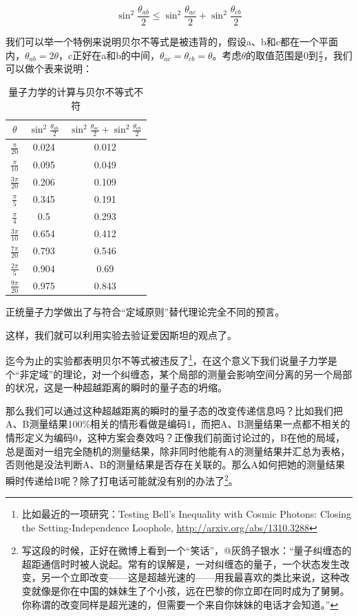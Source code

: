 \begin{equation}
\sin^2 \frac{\theta_{ab}}{2} \le \sin^2 \frac{\theta_{ac}}{2} + \sin^2 \frac{\theta_{cb}}{2}
\end{equation}

我们可以举一个特例来说明贝尔不等式是被违背的，假设a、b和c都在一个平面内，$\theta_{ab} = 2 \theta$，c正好在a和b的中间，$\theta_{ac} = \theta_{cb} = \theta$。考虑$\theta$的取值范围是0到$\frac{\pi}{2}$，我们可以做个表来说明：


\begin{table}[htdp]
\caption{量子力学的计算与贝尔不等式不符}
\begin{center}
\begin{tabular}{|c|c|c|}
\hline
$\theta$ &  $\sin^2 \frac{\theta_{ab}}{2}$  & $\sin^2 \frac{\theta_{ac}}{2} + \sin^2 \frac{\theta_{cb}}{2} $ \\
\hline
$\frac{\pi}{20}$ & 0.024  & 0.012  \\
$\frac{\pi}{10}$ & 0.095  & 0.049  \\
$\frac{3\pi}{20}$ & 0.206  & 0.109  \\
$\frac{\pi}{5}$ & 0.345  & 0.191  \\
$\frac{\pi}{4}$ & 0.5  & 0.293  \\
$\frac{3\pi}{10}$ & 0.654  & 0.412  \\
$\frac{7\pi}{20}$ & 0.793  & 0.546  \\
$\frac{2\pi}{5}$ & 0.904  & 0.69  \\
$\frac{9\pi}{20}$ & 0.975  & 0.843  \\
\hline
\end{tabular}
\end{center}
\label{default}
\end{table}%




正统量子力学做出了与符合“定域原则”替代理论完全不同的预言。

这样，我们就可以利用实验去验证爱因斯坦的观点了。

迄今为止的实验都表明贝尔不等式被违反了\footnote{比如最近的一项研究：Testing Bell's Inequality with Cosmic Photons: Closing the Setting-Independence Loophole, \url{http://arxiv.org/abs/1310.3288}}，在这个意义下我们说量子力学是个“非定域”的理论，对一个纠缠态，某个局部的测量会影响空间分离的另一个局部的状况，这是一种超越距离的瞬时的量子态的坍缩。

那么我们可以通过这种超越距离的瞬时的量子态的改变传递信息吗？比如我们把A、B测量结果100\%相关的情形看做是编码1，而把A、B测量结果一点都不相关的情形定义为编码0，这种方案会奏效吗？正像我们前面讨论过的，B在他的局域，总是面对一组完全随机的测量结果，除非同时他能有A的测量结果并汇总为表格，否则他是没法判断A、B的测量结果是否存在关联的。那么A如何把她的测量结果瞬时传递给B呢？除了打电话可能就没有别的办法了\footnote{写这段的时候，正好在微博上看到一个“笑话”，@灰鸽子银水：“量子纠缠态的超距通信时时被人说起。常有的误解是，一对纠缠态的量子，一个状态发生改变，另一个立即改变——这是超越光速的——用我最喜欢的类比来说，这种改变就像是你在中国的妹妹生了个小孩，远在巴黎的你立即在同时成为了舅舅。你称谓的改变同样是超光速的，但需要一个来自你妹妹的电话才会知道。”}。

